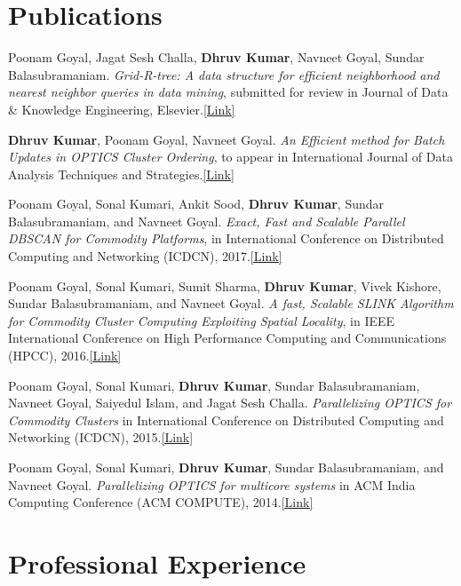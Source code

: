 \documentclass[margin,line]{res}
\begin{document}
\begin{resume}
\section{\sc Publications}
Poonam Goyal, Jagat Sesh Challa, {\bf Dhruv Kumar}, Navneet Goyal, Sundar Balasubramaniam.
{\it Grid-R-tree: A data structure for efficient neighborhood and nearest neighbor queries in
data mining}, submitted for review in Journal of Data \& Knowledge Engineering, Elsevier.\href{https://drive.google.com/open?id=0B5R2WFoF983oN2dCcDJfaE9nVHM}{\color{blue}[Link]}

{\bf Dhruv Kumar}, Poonam Goyal, Navneet Goyal. {\it An Efficient method for Batch Updates in OPTICS Cluster Ordering}, to appear in International Journal of Data Analysis Techniques and
Strategies.\href{https://drive.google.com/open?id=0B5R2WFoF983oUmRrTWlBeWlQNWs}{\color{blue}[Link]}

Poonam Goyal, Sonal Kumari, Ankit Sood, {\bf  Dhruv Kumar}, Sundar Balasubramaniam, and Navneet
Goyal. {\it Exact, Fast and Scalable Parallel DBSCAN for Commodity Platforms}, in International Conference on Distributed Computing and Networking
(ICDCN), 2017.\href{https://drive.google.com/open?id=0B5R2WFoF983oWEtOVUNCS3FUZ1E}{\color{blue}[Link]}

Poonam Goyal, Sonal Kumari, Sumit Sharma, {\bf Dhruv Kumar}, Vivek Kishore, Sundar
Balasubramaniam, and Navneet Goyal. {\it A fast, Scalable SLINK Algorithm for Commodity
Cluster Computing Exploiting Spatial Locality}, in IEEE International Conference on High Performance Computing and Communications (HPCC), 2016.\href{https://drive.google.com/open?id=0B5R2WFoF983obUlHLTBTTmxsMzA}{\color{blue}[Link]}

Poonam Goyal, Sonal Kumari, {\bf Dhruv Kumar}, Sundar Balasubramaniam, Navneet Goyal, Saiyedul
Islam, and Jagat Sesh Challa. {\it Parallelizing OPTICS for Commodity Clusters} in International Conference on Distributed Computing and Networking (ICDCN), 2015.\href{http://dl.acm.org/citation.cfm?id=2684477}{\color{blue}[Link]}

Poonam Goyal, Sonal Kumari, {\bf Dhruv Kumar}, Sundar Balasubramaniam, and Navneet Goyal.  
{\it Parallelizing OPTICS for multicore systems} in ACM India Computing
Conference (ACM COMPUTE), 2014.\href{http://dl.acm.org/citation.cfm?id=2675763}{\color{blue}[Link]}

\section{\sc Professional Experience}


\end{resume}
\end{document}
